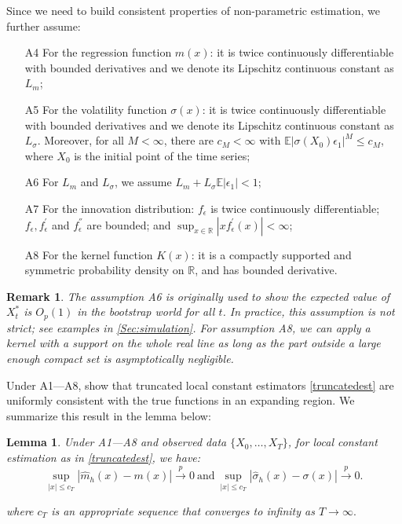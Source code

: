 \documentclass[a4paper]{article}
\newtheorem{Lemma}{Lemma}[section]
\newtheorem*{Remarknn}{Remark}
\begin{document}
Since we need to build consistent properties of non-parametric estimation, we further assume:
\begin{itemize}
    \item [A4] For the regression function $m(x)$: it is twice continuously differentiable with bounded derivatives and we denote its Lipschitz continuous constant as $L_{m}$;
    \item [A5] For the volatility function $\sigma(x)$: it is twice continuously differentiable with bounded derivatives and we denote its Lipschitz continuous constant as $L_{\sigma}$. Moreover, for all $M<\infty$, there are $c_{M}<\infty$ with $\mathbb{E}|\sigma(X_0)\epsilon_1|^{M}\leq c_{M}$, where $X_0$ is the initial point of the time series;
    \item[A6] For $L_{m}$ and $L_{\sigma}$, we assume $L_{m} + L_{\sigma}\mathbb{E}|\epsilon_1|<1$;
    \item [A7] For the innovation distribution: %
 $f_{\epsilon}$ is twice continuously differentiable; $f_{\epsilon}, f^{'}_{\epsilon}$ and $f^{''}_{\epsilon}$ are bounded; and $\sup_{x\in\mathbb{R}}|xf^{'}_{\epsilon}(x)|<\infty$; 
    \item[A8] For the kernel function $K(x)$: it is a compactly supported and symmetric probability density on $\mathbb{R}$, and has bounded derivative.
\end{itemize}
\begin{Remarknn}
    The assumption A6 is originally used to show the expected value of $X_{t}^*$ is $O_{p}(1)$ in the bootstrap world for all $t$. In practice, this assumption is not strict; see examples in \cref{Sec:simulation}. For assumption A8, we can apply a kernel with a support on the whole real line as long as the part outside a large enough compact set is asymptotically negligible. 
\end{Remarknn}
Under A1---A8, \cite{franke2002bootstrap} show that truncated local constant estimators \cref{truncatedest} are uniformly consistent with the true functions in an expanding region. We summarize this result in the lemma below:
\begin{Lemma}\label{Lemma:uniformest}
Under A1---A8 and observed data $\{X_0,\ldots,X_T\}$, for local constant estimation as in  \cref{truncatedest}, we have:
\begin{equation}
         \sup_{|x|\leq c_{T}}|\widehat{m}_h(x) - m(x)|\overset{p}{\to}0~\text{and}~\sup_{|x|\leq c_{T}}|\widehat{\sigma}_h(x) - \sigma(x)|\overset{p}{\to}0.
\end{equation}
 
\noindent
where $c_T$ is an appropriate sequence that converges to infinity as $T\to \infty .$ 
\end{Lemma} 
\end{document}
